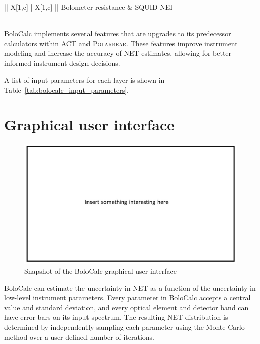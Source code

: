 \begin{table}[!ht]
\begin{minipage}[t]{0.45\textwidth}
\begin{tabu}[t]{|| X[1,c] | X[1,c] ||}
    \hline
    Bolometer resistance & SQUID NEI \\
    \hline
     \\
    \hline
    \end{tabu}
    \end{minipage}
    \vspace{1mm}
    \caption{User-defined parameters within a BoloCalc project. Each of the ``\textit{Optical element definitions}'' are defined for every optical element, except for the aperture spill efficiency, which is only defined for the cold stop.}
    \label{tab:bolocalc_input_parameters}
\end{table}

BoloCalc implements several features that are upgrades to its predecessor calculators within ACT and \textsc{Polarbear}. These features improve instrument modeling and increase the accuracy of NET estimates, allowing for better-informed instrument design decisions.

A list of input parameters for each layer is shown in Table~\ref{tab:bolocalc_input_parameters}.

\section{Graphical user interface}

\begin{figure}[!ht]
    \centering
    \includegraphics[width=0.98\linewidth]{Other/empty.jpg}
    \caption[Snapshot of the BoloCalc graphical user interface]{Snapshot of the BoloCalc graphical user interface}
    \label{fig:bolocalc_gui}
\end{figure}

BoloCalc can estimate the uncertainty in NET as a function of the uncertainty in low-level instrument parameters. Every parameter in BoloCalc accepts a central value and standard deviation, and every optical element and detector band can have error bars on its input spectrum. The resulting NET distribution is determined by independently sampling each parameter using the Monte Carlo method over a user-defined number of iterations. 

